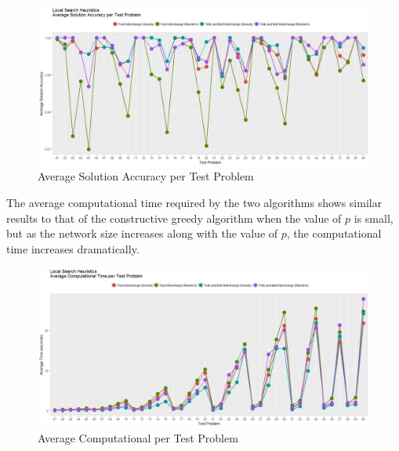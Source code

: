 \documentclass[11pt]{article}
\begin{document}
	\begin{figure}[H]
		\begin{center}
			\includegraphics[width=14cm]{LSavacc.png}
			\caption{Average Solution Accuracy per Test Problem}
			\label{LS.av.acc}
		\end{center}
	\end{figure}

	The average computational time required by the two algorithms shows similar results to that of the constructive greedy algorithm when the value of $p$ is small, but as the network size increases along with the value of $p$, the computational time increases dramatically.


	\begin{figure}[H]
		\begin{center}
			\includegraphics[width=14cm]{LSavtime.png}
			\caption{Average Computational per Test Problem}
			\label{LS.av.time}
		\end{center}
	\end{figure}

		
\end{document}
